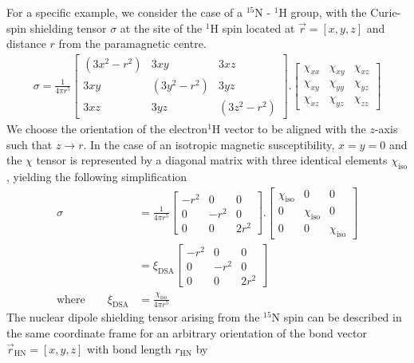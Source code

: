 \documentclass[a4paper,10pt,english,openany,oneside]{sphinxmanual}
\begin{document}
For a specific example, we consider the case of a $^{\text{15}}$N - $^{\text{1}}$H group, with the Curie-spin shielding tensor \(\sigma\) at the site of the $^{\text{1}}$H spin located at \(\vec r=[x,y,z]\) and distance \(r\) from the paramagnetic centre.
\begin{equation*}
\begin{split}\sigma = \frac{1}{4\pi r^5}
\begin{bmatrix}
(3x^2-r^2) & 3xy & 3xz\\
3xy & (3y^2-r^2) & 3yz\\
3xz & 3yz & (3z^2 - r^2)
\end{bmatrix}.
\begin{bmatrix}
\chi_{xx} & \chi_{xy} & \chi_{xz}\\
\chi_{xy} & \chi_{yy} & \chi_{yz}\\
\chi_{xz} & \chi_{yz} & \chi_{zz}
\end{bmatrix}\end{split}
\end{equation*}
We  choose the orientation of the electron\textendash{}$^{\text{1}}$H vector to be aligned with the \(z\)-axis such that \(z\rightarrow r\). In the case of an isotropic magnetic susceptibility, \(x=y=0\) and the \(\chi\) tensor is represented by a diagonal matrix with three identical elements \(\chi_\text{iso}\), yielding the following simplification
\begin{equation*}
\begin{split}\sigma &= \frac{1}{4\pi r^5}
\begin{bmatrix}
-r^2 & 0 & 0\\
0 & -r^2 & 0\\
0 & 0 & 2r^2
\end{bmatrix}.
\begin{bmatrix}
\chi_\text{iso} & 0 & 0\\
0 & \chi_\text{iso} & 0\\
0 & 0 & \chi_\text{iso}
\end{bmatrix}\\
&= \xi_\text{DSA}
\begin{bmatrix}
-r^2 & 0 & 0\\
0 & -r^2 & 0\\
0 & 0 & 2r^2
\end{bmatrix}\\
\text{where} \qquad \xi_\text{DSA}&=\frac{\chi_\text{iso}}{4\pi r^5}\end{split}
\end{equation*}
The nuclear dipole shielding tensor arising from the $^{\text{15}}$N spin can be described in the same coordinate frame for an arbitrary orientation of the bond vector \(\vec r_\text{HN}=[x,y,z]\) with bond length \(r_\text{HN}\) by
\end{document}
